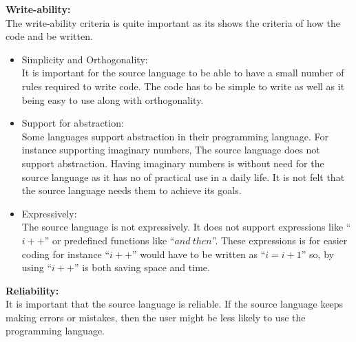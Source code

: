 \textbf{Write-ability:} \\
The write-ability criteria is quite important as its shows the criteria of how the code and be written. 
\begin{itemize}
\item Simplicity and Orthogonality: \\
It is important for the source language to be able to have a small number of rules required to write code. The code has to be simple to write as well as it being easy to use along with orthogonality.
\item Support for abstraction: \\
Some languages support abstraction  in their programming language. For instance supporting imaginary numbers, The source language does not support abstraction. Having imaginary numbers is without need for the source language as it has no of practical use in a daily life. It is not felt that the source language needs them to achieve its goals.
\item Expressively: \\
The source language is not expressively. It does not support expressions like ``$i++$'' or predefined functions like ``$and~then$''. These expressions is for easier coding for instance ``$i++$'' would have to be written as ``$i = i + 1$'' so, by using ``$i++$'' is both saving space and time.
\end{itemize}
\textbf{Reliability:} \\
It is important that the source language is reliable. If the source language keeps making errors or mistakes, then the user might be less likely to use the programming language.
